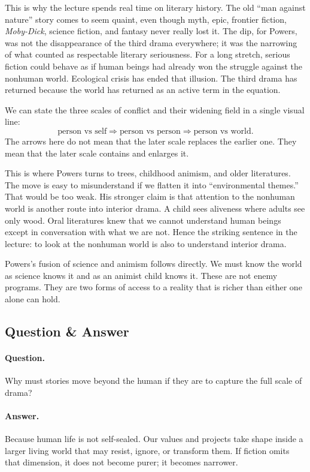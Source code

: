 This is why the lecture spends real time on literary history. The old ``man against nature'' story comes to seem quaint, even though myth, epic, frontier fiction, \emph{Moby-Dick}, science fiction, and fantasy never really lost it. The dip, for Powers, was not the disappearance of the third drama everywhere; it was the narrowing of what counted as respectable literary seriousness. For a long stretch, serious fiction could behave as if human beings had already won the struggle against the nonhuman world. Ecological crisis has ended that illusion. The third drama has returned because the world has returned as an active term in the equation.

We can state the three scales of conflict and their widening field in a single visual line:
\begin{equation}
\text{person vs self} \Rightarrow \text{person vs person} \Rightarrow \text{person vs world}.
\end{equation}
The arrows here do not mean that the later scale replaces the earlier one. They mean that the later scale contains and enlarges it.

This is where Powers turns to trees, childhood animism, and older literatures. The move is easy to misunderstand if we flatten it into ``environmental themes.'' That would be too weak. His stronger claim is that attention to the nonhuman world is another route into interior drama. A child sees aliveness where adults see only wood. Oral literatures knew that we cannot understand human beings except in conversation with what we are not. Hence the striking sentence in the lecture: to look at the nonhuman world is also to understand interior drama.

Powers's fusion of science and animism follows directly. We must know the world as science knows it and as an animist child knows it. These are not enemy programs. They are two forms of access to a reality that is richer than either one alone can hold.

\subsection{Question \& Answer}

\paragraph{Question.} Why must stories move beyond the human if they are to capture the full scale of drama?

\paragraph{Answer.} Because human life is not self-sealed. Our values and projects take shape inside a larger living world that may resist, ignore, or transform them. If fiction omits that dimension, it does not become purer; it becomes narrower.


